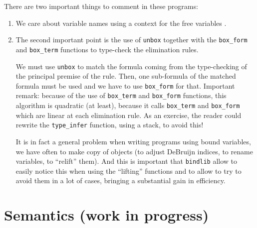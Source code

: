 \documentclass[11pt]{article}
\begin{document}
There are two important things to comment in these programs:
\begin{enumerate}
\item We care about variable names using a context for the free
  variables .

\item The second important point is the use of \verb#unbox# together
  with the \verb#box_form# and \verb#box_term# functions to type-check
  the elimination rules.

We must use \verb#unbox# to match the formula coming from the
type-checking of the principal premise of the rule. Then, one
sub-formula of the matched formula must be used and we have to use
\verb#box_form# for that.
Important remark: because of the use of \verb#box_term# and
\verb#box_form# functions, this algorithm is quadratic (at least), because
it calls \verb#box_term# and \verb#box_form# which are linear at
each elimination rule. As an exercise, the reader could rewrite the
\verb#type_infer# function, using a stack, to avoid this!

It is in fact a general problem when writing programs using bound
variables, we have often to make copy of objects (to adjust DeBruijn
indices, to rename variables, to ``relift'' them). And this is
important that \verb#bindlib# allow to easily notice this when using
the ``lifting'' functions and to allow to try to avoid them in a lot of cases,
bringing a substantial gain in efficiency.
\end{enumerate}

\section{Semantics (work in progress)}
\end{document}
